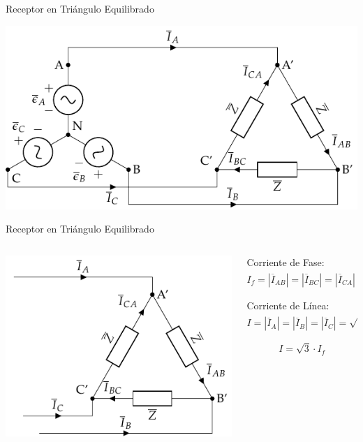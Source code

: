\documentclass[xcolor={usenames,svgnames,dvipsnames}]{beamer}
\begin{document}
\begin{frame}[label={sec:orgb6498f7}]{Receptor en Triángulo Equilibrado}
\begin{center}
\includegraphics[width=.9\linewidth]{figs/TrianguloEquilibrado.pdf}
\end{center}
\end{frame}

\begin{frame}[label={sec:org6163f25}]{Receptor en Triángulo Equilibrado}
\begin{columns}
\begin{column}{0.5\columnwidth}
\begin{center}
\includegraphics[width=.9\linewidth]{figs/TrianguloEquilibrado_Receptor.pdf}
\end{center}
\end{column}

\begin{column}{0.5\columnwidth}
Corriente de Fase:
\[
  \boxed{I_f = |\overline{I}_{AB}| = |\overline{I}_{BC}| = |\overline{I}_{CA}| = \frac{U}{Z}}
\]


Corriente de Línea:
\[
  \boxed{I = |\overline{I}_A| = |\overline{I}_B| = |\overline{I}_C| = \sqrt{3} \cdot \frac{U}{Z}}
\]

\[
  \boxed{I = \sqrt{3} \cdot I_f}
\]
\end{column}
\end{columns}
\end{frame}
\end{document}
